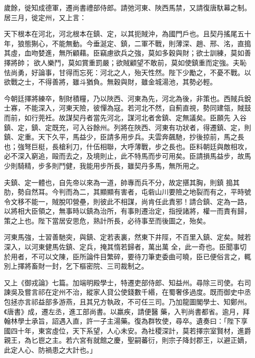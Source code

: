 \begin{pinyinscope}
 歲餘，徙知成德軍，遷尚書禮部侍郎。請弛河東、陜西馬禁，又請復唐馱幕之制。居三月，徙定州，又上言：



 天下根本在河北，河北根本在鎮、定，以其扼賊沖，為國門戶也。且契丹搖尾五十年，狼態猘心，不能無動。今垂涎定、鎮，二軍不戰，則薄深、趙、邢、洺，直搗其虛，血吻婪進，無所顧藉。臣竊慮欲兵之強，莫如多穀與財；欲士訓練，莫如善擇將帥；
 欲人樂鬥，莫如賞重罰嚴；欲賊顧望不敢前，莫如使鎮重而定強。夫恥怯尚勇，好論事，甘得而忘死：河北之人，殆天性然。陛下少勵之，不憂不戰。以欲戰之士，不得善將，雖斗猶負。無穀與財，雖金城湯池，其勢必輕。



 今朝廷擇將練卒，制財積糧，乃以陜西、河東為先，河北為後，非策也。西賊兵銳士寡，不能深入，河東天險，彼憚為寇。若河北不然，自薊直視，勢同建瓴，賊鼓而前，如行莞衽。故謀契丹者當先河北，謀河北者舍鎮、定無議矣。臣願先
 入谷鎮、定，鎮、定既充，可入谷餘州。列將在陜西、河東有功狀者，得遷鎮、定，則鎮、定重。天下久平，馬益少，臣請多用步兵。夫雲奔飆馳，抄後掠前，馬之長也；強弩巨梃，長槍利刀，什伍相聯，大呼薄戰，步之長也。臣料朝廷與敵相攻，必不深入窮追，毆而去之，及境則止，此不特馬而步可用矣。臣請損馬益步，故馬少則騎精，步多則鬥健，我能用步所長，雖契丹多馬，無所用之。



 夫鎮、定一體也，自先帝以來為一道，帥專而兵不分，故定揕其胸，則鎮
 搗其肋，勢自然耳。今判而為二，其顯顯有害者，屯砦山川要險之地裂而有之，平時號令文移不能一，賊脫叩營壘，則彼此不相謀，尚肯任此責邪！請合鎮、定為一路，以將相大臣領之，無事時以鎮為治所，有事則遷治定，指授諸將，權一而責有歸，策之上也。陛下當居安思危，熟計所長，必待事至而後圖之，殆矣。



 河東馬強，士習善馳突，與鎮、定若表裏，然東下井陘，不百里入鎮、定矣。賊若深入，以河東健馬佐鎮、定兵，掩其惰若歸者，萬出萬
 全，此一奇也。臣聞事切於用者，不可以文陳，臣所論件目繁碎，要待刀筆吏委曲可曉，臣已便俗言之，輒別上擇將畜財一封，乞下樞密院、三司裁制之。



 又上《御戎論》七篇。加端明殿學士，特遷吏部侍郎、知益州。尋除三司使。右司諫吳及嘗言祁在定州不治，縱家人貸公使錢數千緡，在蜀奢侈過度。既而御史中丞包拯亦言祁益部多游燕，且其兄方執政，不可任三司。乃加龍圖閣學士、知鄭州。《唐書》成，遷左丞，進工部尚書。以羸疾，請便醫
 藥，入判尚書都省。逾月，拜翰林學士承旨，詔遇入直，許一子主湯藥。復為群牧使，尋卒。遺奏曰：「陛下享國四十年，東宮虛位，天下系望，人心未安。為社稷深計，莫若擇宗室賢材，進爵親王，為匕鬯之主。若六宮有就館之慶，聖嗣蕃衍，則宗子降封郡王，以避正嫡，此定人心、防禍患之大計也。」




\end{pinyinscope}
